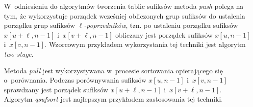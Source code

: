 W~odniesieniu do algorytmów tworzenia tablic sufiksów metoda \emph{push} polega na tym, że
wykorzystuje porządek wcześniej obliczonych grup sufiksów do ustalenia porządku grup sufiksów
$\ell$\textit{-poprze\-dni\-ków}, tzn. po ustaleniu porządku sufiksów $x[u+\ell,n-1]$ i~$x[v+\ell,n-1]$
obliczany jest porządek sufiksów $x[u,n-1]$ i~$x[v,n-1]$. Wzorcowym przykładem wykorzystania tej
techniki jest algorytm \emph{two-stage}.

Metoda \emph{pull} jest wykorzystywana w~procesie sortowania opierającego się o~porównania. Podczas
porównywania sufiksów $x[u,n-1]$ i~$x[v,n-1]$ sprawdzany jest porządek sufiksów $x[u+\ell,n-1]$
i~$x[v+\ell,n-1]$. Algorytm \emph{qsufsort} jest najlepszym przykładem zastosowania tej techniki.


